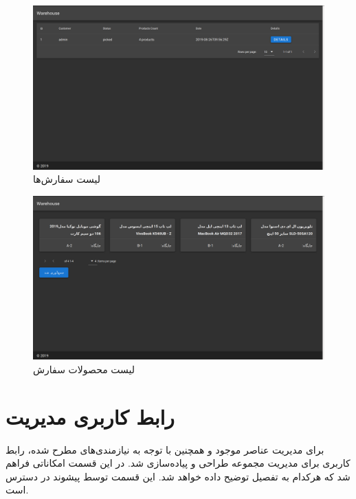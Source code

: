 \begin{figure}[t!]
    \centering
    \includegraphics[scale=0.25]{figures/orders.png}
    \caption{لیست سفارش‌ها }
    \label{orders}
\end{figure}

\begin{figure}[t!]
    \centering
    \includegraphics[scale=0.25]{figures/order.png}
    \caption{لیست محصولات سفارش }
    \label{order}
\end{figure}

\section{رابط کاربری مدیریت}
برای مدیریت عناصر موجود و همچنین با توجه به نیازمندی‌های مطرح شده، رابط کاربری برای مدیریت مجموعه طراحی و پیاده‌سازی شد.
در این قسمت امکاناتی فراهم شد که هرکدام به تفصیل توضیح داده خواهد شد. این قسمت توسط پیشوند  در دسترس است.

